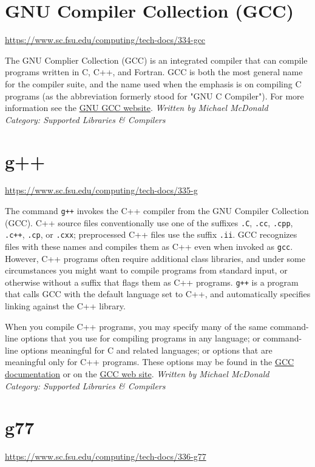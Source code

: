 \documentclass[12pt,a4paper]{article}
\begin{document}
\section{GNU Compiler Collection (GCC)}
\url{https://www.sc.fsu.edu/computing/tech-docs/334-gcc}

The GNU Complier Collection (GCC) is an integrated compiler that can compile programs written in C, C++, and Fortran. GCC is both the most general name for the compiler suite, and the name used when the emphasis is on compiling C programs (as the abbreviation formerly stood for "GNU C Compiler"). For more information see the \href{https://gcc.gnu.org/}{GNU GCC website}.
\hfill \textit{Written by Michael McDonald} \\
\hfill \textit{Category: Supported Libraries \& Compilers}

\section{g++}
\url{https://www.sc.fsu.edu/computing/tech-docs/335-g}

The command \texttt{g++} invokes the C++ compiler from the GNU Compiler Collection (GCC). C++ source files conventionally use one of the suffixes \texttt{.C}, \texttt{.cc}, \texttt{.cpp}, \texttt{.c++}, \texttt{.cp}, or \texttt{.cxx}; preprocessed C++ files use the suffix \texttt{.ii}. GCC recognizes files with these names and compiles them as C++ even when invoked as \texttt{gcc}. However, C++ programs often require additional class libraries, and under some circumstances you might want to compile programs from standard input, or otherwise without a suffix that flags them as C++ programs. \texttt{g++} is a program that calls GCC with the default language set to C++, and automatically specifies linking against the C++ library.

When you compile C++ programs, you may specify many of the same command-line options that you use for compiling programs in any language; or command-line options meaningful for C and related languages; or options that are meaningful only for C++ programs. These options may be found in the \href{https://gcc.gnu.org/onlinedocs/}{GCC documentation} or on the \href{https://gcc.gnu.org/}{GCC web site}.
\hfill \textit{Written by Michael McDonald} \\
\hfill \textit{Category: Supported Libraries \& Compilers}

\section{g77}
\url{https://www.sc.fsu.edu/computing/tech-docs/336-g77}
\end{document}

